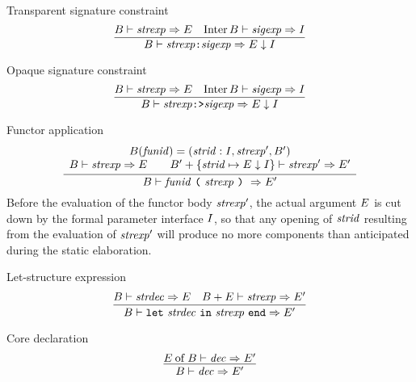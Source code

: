 \begin{inference-rule}{Transparent signature constraint}
\begin{equation}\label{rule:dynamic-modules:transparent-signature-constraint}
\vcenter{\infer{\B\ts\transpconstraint\ra\E\downarrow\I}
  {\B\ts\strexp\ra\E
    & \Inter\B\ts\sigexp\ra\I}}
\end{equation}
\end{inference-rule}

\begin{inference-rule}{Opaque signature constraint}
\begin{equation}\label{rule:dynamic-modules:opaque-signature-constraint}
\vcenter{\infer{\B\ts\opaqueconstraint\ra\E\downarrow\I}
  {\B\ts\strexp\ra\E
    & \Inter\B\ts\sigexp\ra\I}}
\end{equation}
\end{inference-rule}

\begin{inference-rule}{Functor application}
\begin{equation}\label{rule:dynamic-modules:functor-application}
\vcenter{\infer{\B\ts\funappstr\ra\E'}
  {\begin{array}{c}
      \B(\funid)=(\strid:\I,\strexp',\B')\\
      \B\ts\strexp\ra\E\qquad
      \B'+\{\strid\mapsto\E\downarrow\I\}\ts\strexp'\ra\E'\\
   \end{array}}}
\end{equation}
Before the evaluation of the functor body $\textit{strexp\/}'$, the
actual argument $E$ is cut down by the formal parameter
interface $I$, so that any opening of $\textit{strid\/}$ resulting
from the evaluation of $\textit{strexp\/}'$ will produce no more components
than anticipated during the static elaboration.
\end{inference-rule}

\begin{inference-rule}{Let-structure expression}
\begin{equation}\label{rule:dynamic-modules:let-structure-expression}
\vcenter{\infer{\B\ts\letstrexp\ra\E'}
  {\B\ts\strdec\ra\E
    &\B+\E\ts\strexp\ra\E'}}
\end{equation}
\end{inference-rule}


\begin{inference-rule}{Core declaration}
\begin{equation}\label{rule:dynamic-modules:core-declaration}
\vcenter{\infer{\B\ts\dec\ra\E'}
  {\of{\E}{\B}\ts\dec\ra\E'}}
\end{equation}
\end{inference-rule}

